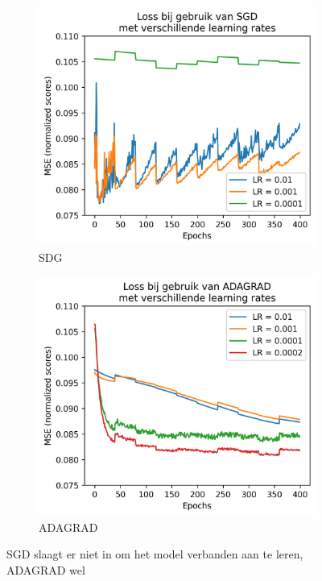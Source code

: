 \begin{figure}[H]
    \begin{subfigure}{.45\textwidth}
        \centering
        \includegraphics[width=1\linewidth]{fig/chapt5/predictor/sgd_slecht.png}
        \caption{SDG}
        \label{fig:chapt5_sgd_slecht_loss}
    \end{subfigure}
    \begin{subfigure}{.45\textwidth}
        \centering
        \includegraphics[width=1\linewidth]{fig/chapt5/predictor/adagrad_goed.png}
        \caption{ADAGRAD}
        \label{fig:chapt5_adagrad_goed}
    \end{subfigure}
    \caption{SGD slaagt er niet in om het model verbanden aan te leren, ADAGRAD wel}
    \label{fig:chapt5_sgd_adagrad_combined}
\end{figure}


